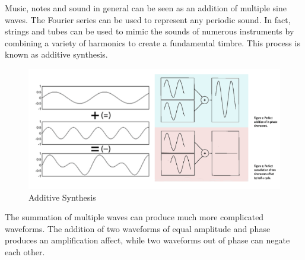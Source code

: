 \documentclass[12pt,a4paper]{article}
\begin{document}
	Music, notes and sound in general can be seen as an addition of multiple sine waves. 
	The Fourier series can be used to represent any periodic sound. In fact, strings and tubes can be used to mimic the sounds of numerous instruments by combining a variety of harmonics to create a fundamental timbre.
	This process is known as additive synthesis.
\newpage
\vspace*{5mm}
\begin{figure}[H]
\begin{center}
		\includegraphics[width=0.7\linewidth]{synthesis}
	\end{center}
	\caption{Additive Synthesis}
\end{figure}
	The summation of multiple waves can produce much more complicated waveforms. 
	The addition of two waveforms of equal amplitude and phase produces an amplification affect, while two waveforms
	out of phase can negate each other.
\newpage
\end{document}
